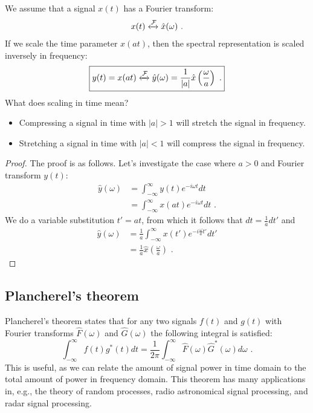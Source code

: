 We assume that a signal $x(t)$ has a Fourier transform:
\begin{align}
    x(t) \xleftrightarrow{\mathcal{F}} \hat{x}(\omega)\,\,.
\end{align}
If we scale the time parameter $x(at)$, then the spectral representation 
is scaled inversely in frequency:
\begin{align}
    \boxed{
        y(t) = x(at) \xleftrightarrow{\mathcal{F}} \hat{y}(\omega) = \frac{1}{|a|}\hat{x}\left(\frac{\omega}{a}\right)\,\,.
        \label{eq:timescale_ft_pair}
    }
\end{align}
What does scaling in time mean?
\begin{itemize}
    \item Compressing a signal in time with $|a|>1$ will stretch the signal in frequency.
    \item Stretching a signal in time with $|a|<1$ will compress the signal in frequency.
\end{itemize}
\begin{proof}
    The proof is as follows. Let's investigate the case where $a > 0$ and Fourier transform $y(t)$:
    \begin{align}
        \hat{y}(\omega) & = \int_{-\infty}^{\infty} y(t) e^{-i\omega t}dt       \\
                        & = \int_{-\infty}^{\infty} x(at) e^{-i\omega t}dt\,\,.
    \end{align}
    We do a variable substitution $t'=at$, from which it follows that $dt=\frac{1}{a}dt'$ and
    \begin{align}
        \hat{y}(\omega) & = \frac{1}{a}\int_{-\infty}^{\infty} x(t') e^{-i\frac{\omega}{a} t' }dt' \\
                        & = \frac{1}{a}\hat{x}\left(\frac{\omega}{a} \right)\,\,.
    \end{align}
\end{proof}


\subsection{Plancherel's theorem}

Plancherel's theorem states that for any two signals $f(t)$ and $g(t)$ with Fourier 
transforms $\hat{F}(\omega)$ and $\hat{G}(\omega)$ the following integral is satisfied:
\begin{equation}
    \boxed{
        \int_{-\infty}^{\infty} f(t) g^*(t) dt = \frac{1}{2\pi} \int_{-\infty}^{\infty}  \hat{F}(\omega)\hat{G}^*(\omega) d\omega\,\,.
    }
    \label{eq:ft_plancherel_theorem}
\end{equation}
This is useful, as we can relate the amount of signal power in time domain to the total 
amount of power in frequency domain. This theorem has many applications in, e.g., the
theory of random processes, radio astronomical signal processing, and radar signal processing.


